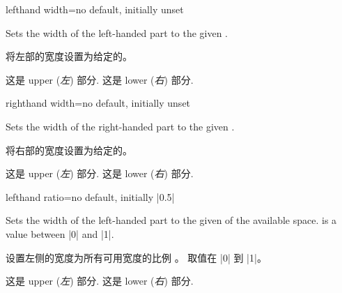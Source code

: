 \begin{docTcbKey}{lefthand width}{=}{no default, initially unset}

Sets the width of the left-handed part to the given .

将左部的宽度设置为给定的。


\begin{dispExample}

\begin{tcolorbox}[title=My title,sidebyside,lefthand width=3cm]
这是 upper (\textit{左}) 部分.
\tcblower
这是 lower (\textit{右}) 部分.
\end{tcolorbox}
\end{dispExample}
\end{docTcbKey}

\enlargethispage*{1cm}
\begin{docTcbKey}{righthand width}{=}{no default, initially unset}

Sets the width of the right-handed part to the given .

将右部的宽度设置为给定的。


\begin{dispExample}

\begin{tcolorbox}[title=My title,sidebyside,righthand width=3cm]
这是 upper (\textit{左}) 部分.
\tcblower
这是 lower (\textit{右}) 部分.
\end{tcolorbox}
\end{dispExample}
\end{docTcbKey}

\begin{docTcbKey}{lefthand ratio}{=}{no default, initially |0.5|}

Sets the width of the left-handed part to the given  of
the available space.  is a value between |0| and |1|.

设置左侧的宽度为所有可用宽度的比例 。
 取值在 |0| 到 |1|。


\begin{dispExample}

\begin{tcolorbox}[title=My title,sidebyside,lefthand ratio=0.25]
这是 upper (\textit{左}) 部分.
\tcblower
这是 lower (\textit{右}) 部分.
\end{tcolorbox}
\end{dispExample}
\end{docTcbKey}


